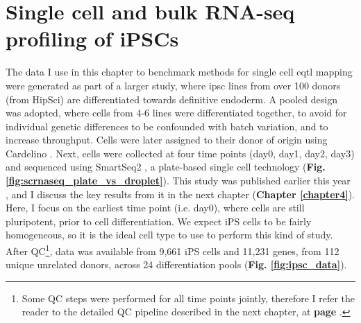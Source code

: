 
\section{Single cell and bulk RNA-seq profiling of iPSCs}

The data I use in this chapter to benchmark methods for single cell \gls{eqtl} mapping 
were generated as part of a larger study, where \gls{ipsc} lines from over 100 donors (from HipSci) are differentiated towards definitive endoderm.
A pooled design was adopted, where cells from 4-6 lines were differentiated together, to avoid for individual genetic differences to be confounded with batch variation, and to increase throughput. 
Cells were later assigned to their donor of origin using Cardelino \cite{mccarthy2020cardelino}. 
Next, cells were collected at four time points (day0, day1, day2, day3) and sequenced using SmartSeq2 \cite{picelli2013smart}, a plate-based single cell technology (\textbf{Fig. \ref{fig:scrnaseq_plate_vs_droplet}}).
This study was published earlier this year \cite{cuomo2020single}, and I discuss the key results from it in the next chapter (\textbf{Chapter 
\ref{chapter4}}). \\

Here,
I focus on the earliest time point (i.e. day0), where cells are still pluripotent, prior to cell differentiation.
We expect iPS cells to be fairly homogeneous, so it is the ideal cell type to use to perform this kind of study.
After QC\footnote{Some QC steps were performed for all time points jointly, therefore I refer the reader to the detailed QC pipeline described in the next chapter, at \textbf{page \pageref{fig:endodiff_qc_workflow}}.}, data was available from 9,661 iPS cells and 11,231 genes, from 112 unique unrelated donors, across 24 differentiation pools (\textbf{Fig. \ref{fig:ipsc_data}}).


